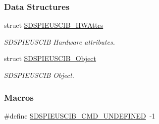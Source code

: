 \subsubsection*{Data Structures}
\begin{DoxyCompactItemize}
\item 
struct \hyperlink{struct_s_d_s_p_i_e_u_s_c_i_b___h_w_attrs}{S\-D\-S\-P\-I\-E\-U\-S\-C\-I\-B\-\_\-\-H\-W\-Attrs}
\begin{DoxyCompactList}\small\item\em S\-D\-S\-P\-I\-E\-U\-S\-C\-I\-B Hardware attributes. \end{DoxyCompactList}\item 
struct \hyperlink{struct_s_d_s_p_i_e_u_s_c_i_b___object}{S\-D\-S\-P\-I\-E\-U\-S\-C\-I\-B\-\_\-\-Object}
\begin{DoxyCompactList}\small\item\em S\-D\-S\-P\-I\-E\-U\-S\-C\-I\-B Object. \end{DoxyCompactList}\end{DoxyCompactItemize}
\subsubsection*{Macros}
\begin{DoxyCompactItemize}
\item 
\#define \hyperlink{_s_d_s_p_i_e_u_s_c_i_b_8h_a91362a560547aa38f75605a26fd9fab8}{S\-D\-S\-P\-I\-E\-U\-S\-C\-I\-B\-\_\-\-C\-M\-D\-\_\-\-U\-N\-D\-E\-F\-I\-N\-E\-D}~-\/1
\end{DoxyCompactItemize}
